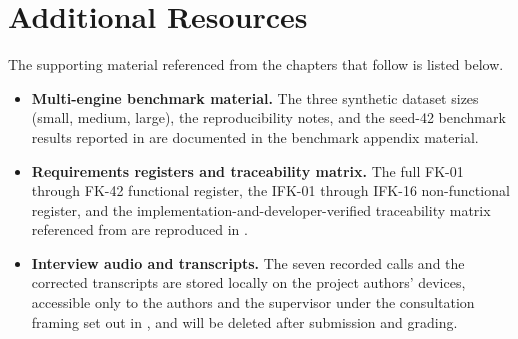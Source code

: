 \section{Additional Resources}
\label{sec:additional-resources}

The supporting material referenced from the chapters that follow is listed below.

\begin{itemize}
  \item \textbf{Multi-engine benchmark material.} The three synthetic dataset sizes (small, medium, large), the reproducibility notes, and the seed-42 benchmark results reported in  are documented in the benchmark appendix material.
  \item \textbf{Requirements registers and traceability matrix.} The full FK-01 through FK-42 functional register, the IFK-01 through IFK-16 non-functional register, and the implementation-and-developer-verified traceability matrix referenced from  are reproduced in .
  \item \textbf{Interview audio and transcripts.} The seven recorded calls and the corrected transcripts are stored locally on the project authors' devices, accessible only to the authors and the supervisor under the consultation framing set out in , and will be deleted after submission and grading.
\end{itemize}
